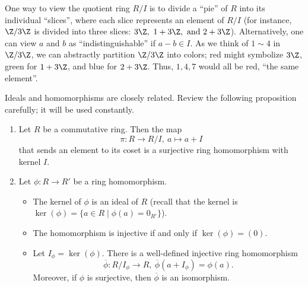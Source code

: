 \documentclass[math1530-lecture-notes]{subfiles}
\begin{document}
\begin{remark}
  One way to view the quotient ring $R / I$ is to divide a ``pie'' of $R$ into its individual
  ``slices'', where each slice represents an element of $R / I$ (for instance, $\Z / 3\Z$ is divided
  into three slices: $3\Z,\ 1+3\Z,~\text{and}~2+3\Z$). Alternatively, one can view $a$ and $b$ as
  ``indistinguishable'' if $a-b\in I$. As we think of $1\sim 4$ in $\Z / 3\Z$, we can abstractly
  partition $\Z / 3\Z$ into colors; red might symbolize $3\Z$, green for $1+3\Z$, and blue for
  $2+3\Z$. Thus, $1,4,7$ would all be red, ``the same element''. 
\end{remark}

Ideals and homomorphisms are closely related. Review the following proposition carefully; it will be
used constantly.

\begin{proposition}[]{}
  \begin{enumerate}
    \item Let $R$ be a commutative ring. Then the map \[
        \pi: R\longrightarrow R/I,\ a\longmapsto a+I
      \] that sends an element to its coset is a surjective ring homomorphism with kernel $I$.
    \item Let $\phi: R\to R'$ be a ring homomorphism.
      \begin{itemize}
        \item The kernel of $\phi$ is an ideal of $R$ (recall that the kernel is $\ker(\phi)=\{a\in
          R\mid \phi(a)=0_{R'}\}$).
        \item The homomorphism is injective if and only if $\ker(\phi)=(0)$.
        \item Let $I_\phi=\ker(\phi)$. There is a well-defined injective ring homomorphism \[
            \overline{\phi}: R / I_\phi \longrightarrow R,\ \overline{\phi}(a+I_\phi)=\phi(a)
        .\] Moreover, if $\phi$ is surjective, then $\overline{\phi}$ is an isomorphism.
      \end{itemize}
  \end{enumerate}
\end{proposition}
\end{document}
